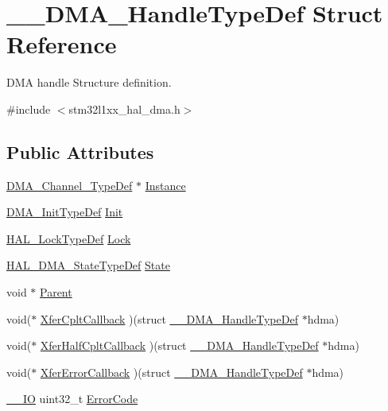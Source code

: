 \hypertarget{struct_____d_m_a___handle_type_def}{\section{\-\_\-\-\_\-\-D\-M\-A\-\_\-\-Handle\-Type\-Def Struct Reference}
\label{struct_____d_m_a___handle_type_def}
}


D\-M\-A handle Structure definition.  




{\ttfamily \#include $<$stm32l1xx\-\_\-hal\-\_\-dma.\-h$>$}

\subsection*{Public Attributes}
\begin{DoxyCompactItemize}
\item 
\hyperlink{struct_d_m_a___channel___type_def}{D\-M\-A\-\_\-\-Channel\-\_\-\-Type\-Def} $\ast$ \hyperlink{struct_____d_m_a___handle_type_def_a9368ced5769abb92a56886ff879a7f5e}{Instance}
\item 
\hyperlink{struct_d_m_a___init_type_def}{D\-M\-A\-\_\-\-Init\-Type\-Def} \hyperlink{struct_____d_m_a___handle_type_def_a3792cb34cedb0e2ab204e41b53ef75ad}{Init}
\item 
\hyperlink{stm32l1xx__hal__def_8h_ab367482e943333a1299294eadaad284b}{H\-A\-L\-\_\-\-Lock\-Type\-Def} \hyperlink{struct_____d_m_a___handle_type_def_a005e867f695aa4b85aca665af7345b51}{Lock}
\item 
\hyperlink{group___d_m_a___exported___types_ga9c012af359987a240826f29073bbe463}{H\-A\-L\-\_\-\-D\-M\-A\-\_\-\-State\-Type\-Def} \hyperlink{struct_____d_m_a___handle_type_def_a0b49bf72e4c2a6071077020955978ecf}{State}
\item 
void $\ast$ \hyperlink{struct_____d_m_a___handle_type_def_af42684decd26b1c5d49a529fcf99be30}{Parent}
\item 
void($\ast$ \hyperlink{struct_____d_m_a___handle_type_def_a9df80ef74c20c2068a67dfe5f764dac7}{Xfer\-Cplt\-Callback} )(struct \hyperlink{struct_____d_m_a___handle_type_def}{\-\_\-\-\_\-\-D\-M\-A\-\_\-\-Handle\-Type\-Def} $\ast$hdma)
\item 
void($\ast$ \hyperlink{struct_____d_m_a___handle_type_def_ae28485fb5491c719ac0d765d40eb8ed7}{Xfer\-Half\-Cplt\-Callback} )(struct \hyperlink{struct_____d_m_a___handle_type_def}{\-\_\-\-\_\-\-D\-M\-A\-\_\-\-Handle\-Type\-Def} $\ast$hdma)
\item 
void($\ast$ \hyperlink{struct_____d_m_a___handle_type_def_aa9c22cf22623f4a9cff0346eb38aa157}{Xfer\-Error\-Callback} )(struct \hyperlink{struct_____d_m_a___handle_type_def}{\-\_\-\-\_\-\-D\-M\-A\-\_\-\-Handle\-Type\-Def} $\ast$hdma)
\item 
\hyperlink{core__sc300_8h_aec43007d9998a0a0e01faede4133d6be}{\-\_\-\-\_\-\-I\-O} uint32\-\_\-t \hyperlink{struct_____d_m_a___handle_type_def_a67a2a8b907bc9b5c0af87f9de2bffc29}{Error\-Code}
\end{DoxyCompactItemize}


